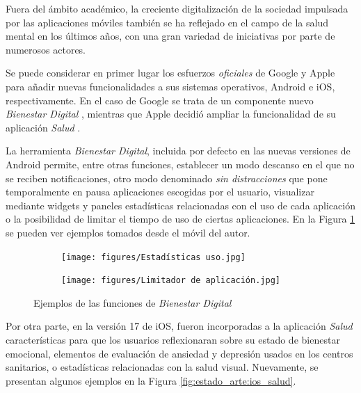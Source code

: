         Fuera del ámbito académico, la creciente digitalización de la sociedad impulsada por las aplicaciones móviles también se ha reflejado en el campo de la salud mental en los últimos años, con una gran variedad de iniciativas por parte de numerosos actores.

        Se puede considerar en primer lugar los esfuerzos \textit{oficiales} de Google y Apple para añadir nuevas funcionalidades a sus sistemas operativos, Android e iOS, respectivamente. En el caso de Google se trata de un componente nuevo \textit{Bienestar Digital} \cite{android_bienestar_nodate}, mientras que Apple decidió ampliar la funcionalidad de su aplicación \textit{Salud} \cite{apple_newsroom_apple_2023}.
        
        La herramienta \textit{Bienestar Digital}, incluida por defecto en las nuevas versiones de Android permite, entre otras funciones, establecer un modo descanso en el que no se reciben notificaciones, otro modo denominado \textit{sin distracciones} que pone temporalmente en pausa aplicaciones escogidas por el usuario, visualizar mediante \glspl{widget} y paneles estadísticas relacionadas con el uso de cada aplicación o la posibilidad de limitar el tiempo de uso de ciertas aplicaciones. En la Figura \ref{fig:estado_arte:bienestar_digital} se pueden ver ejemplos tomados desde el móvil del autor.

        \begin{figure}[h]
            \begin{subfigure}[t]{0.48\textwidth}
                \texttt{[image: figures/Estadísticas uso.jpg]}
            \end{subfigure}
            \hfill
            \begin{subfigure}[t]{0.49\textwidth}
                \texttt{[image: figures/Limitador de aplicación.jpg]}
            \end{subfigure}
            \caption{Ejemplos de las funciones de \textit{Bienestar Digital}}
            \label{fig:estado_arte:bienestar_digital}
        \end{figure}

        Por otra parte, en la versión 17 de iOS, fueron incorporadas a la aplicación \textit{Salud} características para que los usuarios reflexionaran sobre su estado de bienestar emocional, elementos de evaluación de ansiedad y depresión usados en los centros sanitarios, o estadísticas relacionadas con la salud visual. Nuevamente, se presentan algunos ejemplos en la Figura \ref{fig:estado_arte:ios_salud}.

